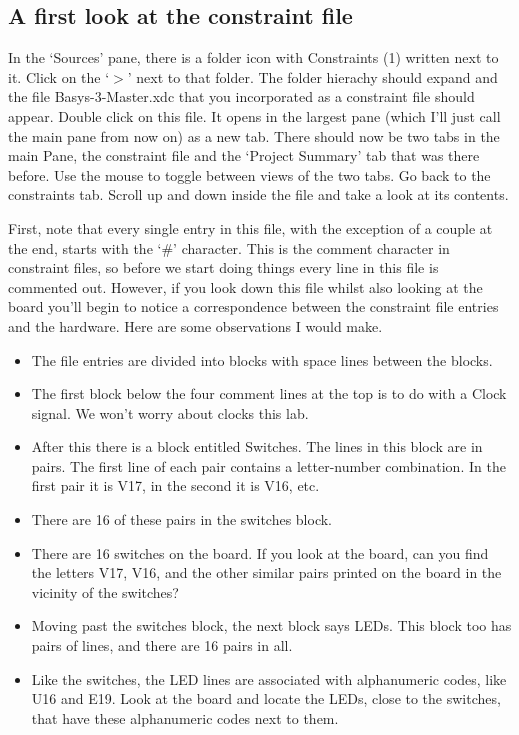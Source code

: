 \documentclass[../physical_computing.tex]{subfiles}
\begin{document}
\subsection{A first look at the constraint file}
\label{sec:constraint_file}

In the `Sources' pane, there is a folder icon with Constraints (1) written next to it. Click on the `$>$' next to that folder. The folder hierachy should expand and the file Basys-3-Master.xdc that you incorporated as a constraint file should appear. Double click on this file. It opens in the largest pane (which I'll just call the main pane from now on) as a new tab. There should now be two tabs in the main Pane, the constraint file and the `Project Summary' tab that was there before. Use the mouse to toggle between views of the two tabs. Go back to the constraints tab. Scroll up and down inside the file and take a look at its contents.

First, note that every single entry in this file, with the exception of a couple at the end, starts with the `\#' character. This is the comment character in constraint files, so before we start doing things every line in this file is commented out. However, if you look down this file whilst also looking at the board you'll begin to notice a correspondence between the constraint file entries and the hardware. Here are some observations I would make.

\begin{itemize}
    \item The file entries are divided into blocks with space lines between the blocks.
    \item The first block below the four comment lines at the top is to do with a Clock signal. We won't worry about clocks this lab.
    \item After this there is a block entitled Switches. The lines in this block are in pairs. The first line of each pair contains a letter-number combination. In the first pair it is V17, in the second it is V16, etc.
    \item There are 16 of these pairs in the switches block.
    \item There are 16 switches on the board. If you look at the board, can you find the letters V17, V16, and the other similar pairs printed on the board in the vicinity of the switches?
    \item Moving past the switches block, the next block says LEDs. This block too has pairs of lines, and there are 16 pairs in all.
    \item Like the switches, the LED lines are associated with alphanumeric codes, like U16 and E19. Look at the board and locate the LEDs, close to the switches, that have these alphanumeric codes next to them.
\end{itemize}
\end{document}
